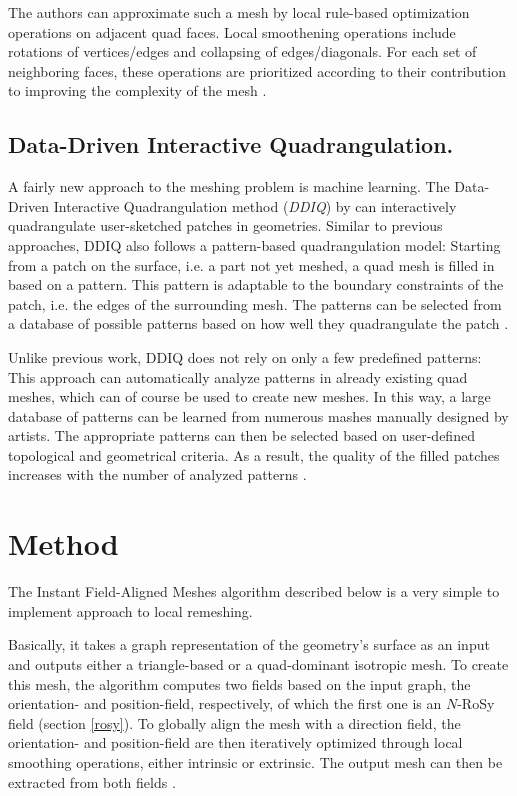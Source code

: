 \documentclass{ACGSeminar}
\begin{document}
The authors can approximate such a mesh by local rule-based optimization operations on adjacent quad faces. Local smoothening operations include rotations of vertices/edges and collapsing of edges/diagonals. For each set of neighboring faces, these operations are prioritized according to their contribution to improving the complexity of the mesh \cite{tarini2010practical}.

\subsection*{Data-Driven Interactive Quadrangulation.}\label{DDIQ}
A fairly new approach to the meshing problem is machine learning. The Data-Driven Interactive Quadrangulation method (\textit{DDIQ}) by \cite{marcias2015data} can interactively quadrangulate user-sketched patches in geometries. Similar to previous approaches, DDIQ also follows a pattern-based quadrangulation model: Starting from a patch on the surface, i.e. a part not yet meshed, a quad mesh is filled in based on a pattern. This pattern is adaptable to the boundary constraints of the patch, i.e. the edges of the surrounding mesh. The patterns can be selected from a database of possible patterns based on how well they quadrangulate the patch \cite{marcias2015data}.

Unlike previous work, DDIQ does not rely on only a few predefined patterns: This approach can automatically analyze patterns in already existing quad meshes, which can of course be used to create new meshes. In this way, a large database of patterns can be learned from numerous mashes manually designed by artists. The appropriate patterns can then be selected based on user-defined topological and geometrical criteria. As a result, the quality of the filled patches increases with the number of analyzed patterns \cite{marcias2015data}.


\section{Method}\label{algorithm}
The Instant Field-Aligned Meshes algorithm described below is a very simple to implement approach to local remeshing.

Basically, it takes a graph representation of the geometry's surface as an input and outputs either a triangle-based or a quad-dominant isotropic mesh. To create this mesh, the algorithm computes two fields based on the input graph, the orientation- and position-field, respectively, of which the first one is an $N$-RoSy field (section \ref{rosy}). To globally align the mesh with a direction field, the orientation- and position-field are then iteratively optimized through local smoothing operations, either intrinsic or extrinsic. The output mesh can then be extracted from both fields \cite{jakob2015instant}.
\end{document}
